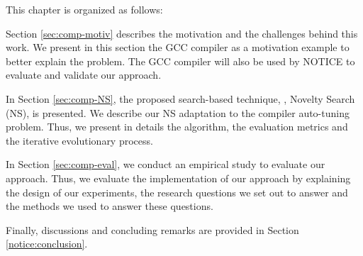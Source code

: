 	

This chapter is organized as follows: 


Section \ref{sec:comp-motiv} describes the motivation and the challenges behind this work. We present in this section the GCC compiler as a motivation example to better explain the problem. The GCC compiler will also be used by NOTICE to evaluate and validate our approach. 

In Section \ref{sec:comp-NS}, the proposed search-based technique, \ie, Novelty Search (NS), is presented. We describe our NS adaptation to the compiler auto-tuning problem. Thus, we present in details the algorithm, the evaluation metrics and the iterative evolutionary process. 

In Section \ref{sec:comp-eval}, we conduct an empirical study to evaluate our approach. Thus, we evaluate the implementation of our approach by explaining the design of our experiments, the research questions we set out to answer and the methods we used to answer these questions.

Finally, discussions and concluding remarks are provided in Section \ref{notice:conclusion}\@.
	

